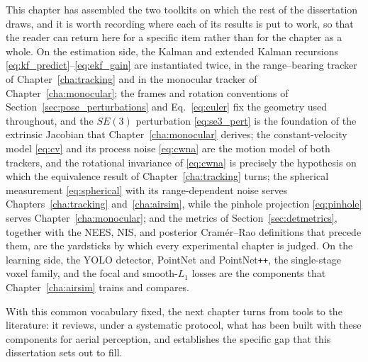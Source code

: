 This chapter has assembled the two toolkits on which the rest of the dissertation
draws, and it is worth recording where each of its results is put to work, so that
the reader can return here for a specific item rather than for the chapter as a
whole. On the estimation side, the Kalman and extended Kalman recursions
\eqref{eq:kf_predict}--\eqref{eq:ekf_gain} are instantiated twice, in the
range--bearing tracker of Chapter~\ref{cha:tracking} and in the monocular tracker
of Chapter~\ref{cha:monocular}; the frames and rotation conventions of
Section~\ref{sec:pose_perturbations} and Eq.~\eqref{eq:euler} fix the geometry
used throughout, and the $SE(3)$ perturbation \eqref{eq:se3_pert} is the
foundation of the extrinsic Jacobian that Chapter~\ref{cha:monocular} derives;
the constant-velocity model \eqref{eq:cv} and its process noise \eqref{eq:cwna}
are the motion model of both trackers, and the rotational invariance of
\eqref{eq:cwna} is precisely the hypothesis on which the equivalence result of
Chapter~\ref{cha:tracking} turns; the spherical measurement \eqref{eq:spherical}
with its range-dependent noise serves Chapters~\ref{cha:tracking}
and~\ref{cha:airsim}, while the pinhole projection \eqref{eq:pinhole} serves
Chapter~\ref{cha:monocular}; and the metrics of Section~\ref{sec:detmetrics},
together with the NEES, NIS, and posterior Cram\'er--Rao definitions that precede
them, are the yardsticks by which every experimental chapter is judged. On the
learning side, the YOLO detector, PointNet and PointNet\texttt{++}, the
single-stage voxel family, and the focal and smooth-$L_1$ losses are the
components that Chapter~\ref{cha:airsim} trains and compares.

With this common vocabulary fixed, the next chapter turns from tools to the
literature: it reviews, under a systematic protocol, what has been built with
these components for aerial perception, and establishes the specific gap that this
dissertation sets out to fill.
